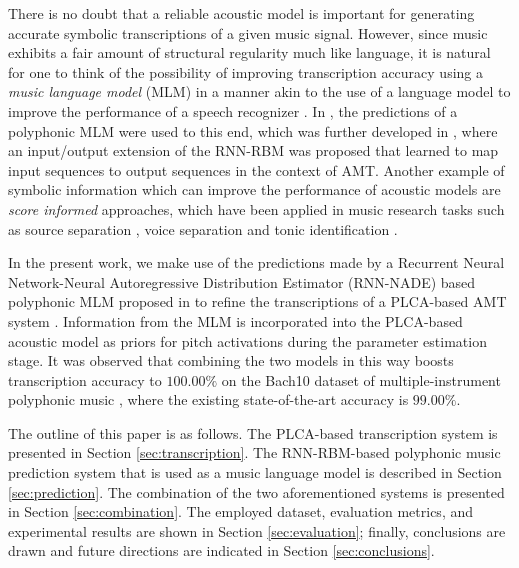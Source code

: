 There is no doubt that a reliable acoustic model is important for generating accurate symbolic transcriptions of a given music signal. However, since music exhibits a fair amount of structural regularity much like language, it is natural for one to think of the possibility of improving transcription accuracy using a \textit{music language model} (MLM) in a manner akin to the use of a language model to improve the performance of a speech recognizer \cite{Rabiner1993}. In \cite{Boulanger-Lewandowski2012}, the predictions of a polyphonic MLM were used to this end, which was further developed in \cite{Boulanger-Lewandowski2013}, where an input/output extension of the RNN-RBM was proposed that learned to map input sequences to output sequences in the context of AMT. Another example of symbolic information which can improve the performance of acoustic models are \textit{score informed} approaches, which have been applied in music research tasks such as source separation \cite{Ewert2012}, voice separation \cite{
Ewert2011} and tonic identification \cite{Senturk2013}. %

In the present work, we make use of the predictions made by a Recurrent Neural Network-Neural Autoregressive Distribution Estimator (RNN-NADE) based polyphonic MLM proposed in \cite{Boulanger-Lewandowski2012} to refine the transcriptions of a PLCA-based AMT system \cite{Benetos2012, Benetos2013}. Information from the MLM is incorporated into the PLCA-based acoustic model as priors for pitch activations during the parameter estimation stage. It was observed that combining the two models in this way boosts transcription accuracy to $100.00\%$ on the Bach10 dataset of multiple-instrument polyphonic music \cite{Duan2010}, where the existing state-of-the-art accuracy is $99.00\%$. 

The outline of this paper is as follows. The PLCA-based transcription system is presented in Section \ref{sec:transcription}. The RNN-RBM-based polyphonic music prediction system that is used as a music language model is described in Section \ref{sec:prediction}. The combination of the two aforementioned systems is presented in Section \ref{sec:combination}. The employed dataset, evaluation metrics, and experimental results are shown in Section \ref{sec:evaluation}; finally, conclusions are drawn and future directions are indicated in Section \ref{sec:conclusions}.
